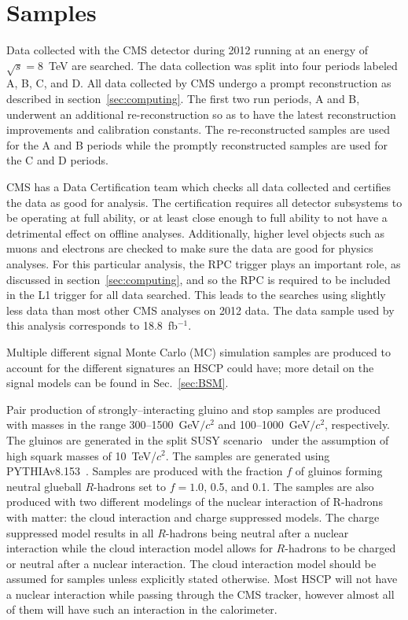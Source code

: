 \section{Samples \label{sec:samples}}

Data collected with the CMS detector during 2012 running at an energy of $\sqrt{s}=8$~TeV are searched. The data collection was split into four periods labeled A, B, C, and D.
All data collected by CMS undergo a prompt reconstruction as described in section~\ref{sec:computing}. The first two run periods, A and B, underwent an additional
re-reconstruction so as to have the latest reconstruction improvements and calibration constants. The re-reconstructed samples are used for the A and B periods while the promptly
reconstructed samples are used for the C and D periods.

CMS has a Data Certification team which checks all data collected and certifies the data as good for analysis. The certification requires all detector subsystems to be
operating at full ability, or at least close enough to full ability to not have a detrimental effect on offline analyses. Additionally, higher level objects such as muons
and electrons are checked to make sure the data are good for physics analyses. For this particular analysis, the RPC trigger plays an important role, as discussed in
section~\ref{sec:computing}, and so the RPC is required to be included in the L1 trigger for all data searched. This leads to the searches using slightly less data
than most other CMS analyses on 2012 data. The data sample used by this analysis corresponds to 18.8~fb$^{-1}$.

Multiple different signal Monte Carlo (MC) simulation samples are produced to account for the different signatures an HSCP could have;
more detail on the signal models can be found in Sec.~\ref{sec:BSM}.

Pair production of strongly--interacting gluino and stop samples are produced with
masses in the range 300--1500~GeV$/c^2$ and 100--1000~GeV$/c^2$, respectively.
The gluinos are generated in the split SUSY scenario~\cite{ArkaniHamed:2004fb, Giudice:2004tc}
under the assumption of high squark masses of 10~TeV/$c^2$. The samples are generated using PYTHIAv8.153~\cite{Sjostrand:2007gs}.
Samples are produced with the fraction $f$ of gluinos forming neutral glueball $R$-hadrons set to $f=1.0$, 0.5, and 0.1.
The samples are also produced with two different modelings of the nuclear interaction of R-hadrons with matter: the cloud interaction and charge suppressed models.
The charge suppressed model results in all $R$-hadrons being neutral after a nuclear interaction while the cloud interaction model allows for $R$-hadrons
to be charged or neutral after a nuclear interaction.
The cloud interaction model should be assumed for samples unless explicitly stated otherwise.
Most HSCP will not have a nuclear interaction while passing through the CMS tracker, however almost all of them will have such an interaction in the calorimeter.

